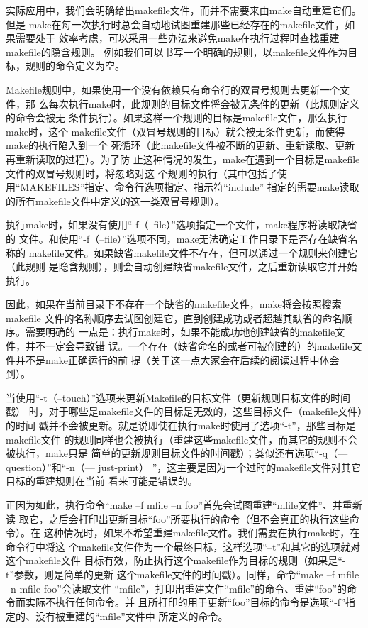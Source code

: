实际应用中，我们会明确给出makefile文件，而并不需要来由make自动重建它们。但是
make在每一次执行时总会自动地试图重建那些已经存在的makefile文件，如果需要处于
效率考虑，可以采用一些办法来避免make在执行过程时查找重建makefile的隐含规则。
例如我们可以书写一个明确的规则，以makefile文件作为目标，规则的命令定义为空。

Makefile规则中，如果使用一个没有依赖只有命令行的双冒号规则去更新一个文件，那
么每次执行make时，此规则的目标文件将会被无条件的更新（此规则定义的命令会被无
条件执行）。如果这样一个规则的目标是makefile文件，那么执行make时，这个
makefile文件（双冒号规则的目标）就会被无条件更新，而使得make的执行陷入到一个
死循环（此makefile文件被不断的更新、重新读取、更新再重新读取的过程）。为了防
止这种情况的发生，make在遇到一个目标是makefile文件的双冒号规则时，将忽略对这
个规则的执行（其中包括了使用“MAKEFILES”指定、命令行选项指定、指示符“include”
指定的需要make读取的所有makefile文件中定义的这一类双冒号规则）。

执行make时，如果没有使用“-f（--file）”选项指定一个文件，make程序将读取缺省的
文件。和使用“-f（--file）”选项不同，make无法确定工作目录下是否存在缺省名称的
makefile文件。如果缺省makefile文件不存在，但可以通过一个规则来创建它（此规则
是隐含规则），则会自动创建缺省makefile文件，之后重新读取它并开始执行。

因此，如果在当前目录下不存在一个缺省的makefile文件，make将会按照搜索makefile
文件的名称顺序去试图创建它，直到创建成功或者超越其缺省的命名顺序。需要明确的
一点是：执行make时，如果不能成功地创建缺省的makefile文件，并不一定会导致错
误。一个存在（缺省命名的或者可被创建的）的makefile文件并不是make正确运行的前
提（关于这一点大家会在后续的阅读过程中体会到）。

当使用“-t（--touch）”选项来更新Makefile的目标文件（更新规则目标文件的时间戳）
时，对于哪些是makefile文件的目标是无效的，这些目标文件（makefile文件）的时间
戳并不会被更新。就是说即使在执行make时使用了选项“-t”，那些目标是makefile文件
的规则同样也会被执行（重建这些makefile文件，而其它的规则不会被执行，make只是
简单的更新规则目标文件的时间戳）；类似还有选项“-q（—question）”和“-n（—
just-print） ”，这主要是因为一个过时的makefile文件对其它目标的重建规则在当前
看来可能是错误的。

正因为如此，执行命令“make –f mfile –n foo”首先会试图重建“mfile文件”、并重新读
取它，之后会打印出更新目标“foo”所要执行的命令（但不会真正的执行这些命令）。在
这种情况时，如果不希望重建makefile文件。我们需要在执行make时，在命令行中将这
个makefile文件作为一个最终目标，这样选项“–t”和其它的选项就对这个makefile文件
目标有效，防止执行这个makefile作为目标的规则（如果是“-t”参数，则是简单的更新
这个makefile文件的时间戳）。同样，命令“make –f mfile –n mfile foo”会读取文件
“mfile”，打印出重建文件“mfile”的命令、重建“foo”的命令而实际不执行任何命令。并
且所打印的用于更新“foo”目标的命令是选项“-f”指定的、没有被重建的“mfile”文件中
所定义的命令。


